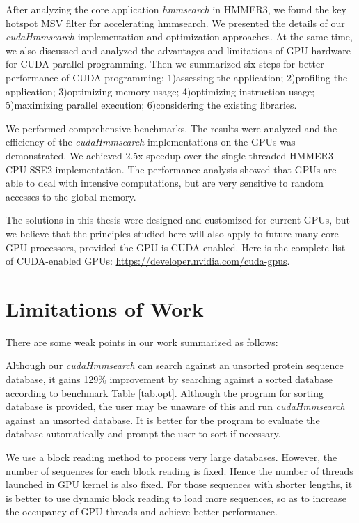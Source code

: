 After analyzing the core application \emph{hmmsearch} in HMMER3, we found the key hotspot MSV filter for accelerating hmmsearch. We presented the details of our \emph{cudaHmmsearch} implementation and optimization approaches. At the same time, we also discussed and analyzed the advantages and limitations of GPU hardware for CUDA parallel programming. Then we summarized six steps for better performance of CUDA programming: 1)assessing the application; 2)profiling the application; 3)optimizing memory usage; 4)optimizing instruction usage; 5)maximizing parallel execution; 6)considering the existing libraries.

We performed comprehensive benchmarks. The results were analyzed and the efficiency of the \emph{cudaHmmsearch} implementations on the GPUs was demonstrated. We achieved 2.5x speedup over the single-threaded HMMER3 CPU SSE2 implementation. The performance analysis showed that GPUs are able to deal with intensive computations, but are very sensitive to random accesses to the global memory.

The solutions in this thesis were designed and customized for current GPUs, but we believe that the principles studied here will also apply to future many-core GPU processors, provided the GPU is CUDA-enabled. Here is the complete list of CUDA-enabled GPUs: \url{https://developer.nvidia.com/cuda-gpus}.


\section{Limitations of Work}
There are some weak points in our work summarized as follows:

Although our \emph{cudaHmmsearch} can search against an unsorted protein sequence database, it gains 129\% improvement by searching against a sorted database according to benchmark Table \ref{tab.opt}. Although the program for sorting database is provided, the user may be unaware of this and run \emph{cudaHmmsearch} against an unsorted database. It is better for the program to evaluate the database automatically and prompt the user to sort if necessary.

We use a block reading method to process very large databases. However, the number of sequences for each block reading is fixed. Hence the number of threads launched in GPU kernel is also fixed. For those sequences with shorter lengths, it is better to use dynamic block reading to load more sequences, so as to increase the occupancy of GPU threads and achieve better performance.

